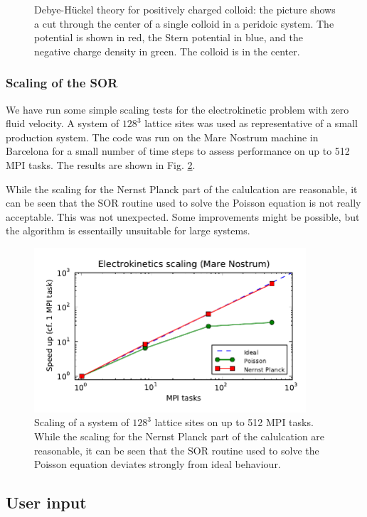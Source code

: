 \begin{figure}[htpb]
\caption{Debye-H\"uckel theory for positively charged colloid: the picture
shows a cut through the center of a single colloid in a peridoic system.
The potential is shown in red, the Stern potential in blue, and the negative 
charge density in green. The colloid is in the center.}
\label{fig7}
\end{figure}
\clearpage

\subsubsection{Scaling of the SOR}

We have run some simple scaling tests for the electrokinetic problem
with zero fluid velocity. A system of $128^3$ lattice sites was used
as representative of a small production system. The code was run on
the Mare Nostrum machine in Barcelona for a small number of time
steps to assess performance on up to 512 MPI tasks. The results are
shown in Fig. \ref{fig5}. 

While the scaling for the Nernst Planck part of
the calulcation are reasonable, it can be seen that the SOR routine
used to solve the Poisson equation is not really acceptable. This
was not unexpected. Some improvements might be possible, but the
algorithm is essentailly unsuitable for large systems. 

\begin{figure}[htpb]
\includegraphics[width=0.9\textwidth]{./pics/scaling.pdf}
\caption{Scaling of a system of $128^3$ lattice sites on up to 512 MPI tasks. 
While the scaling for the Nernst Planck part of the calulcation are reasonable, 
it can be seen that the SOR routine used to solve the Poisson equation deviates
strongly from ideal behaviour.} 
\label{fig5} 
\end{figure}
\clearpage


\subsection{User input}
